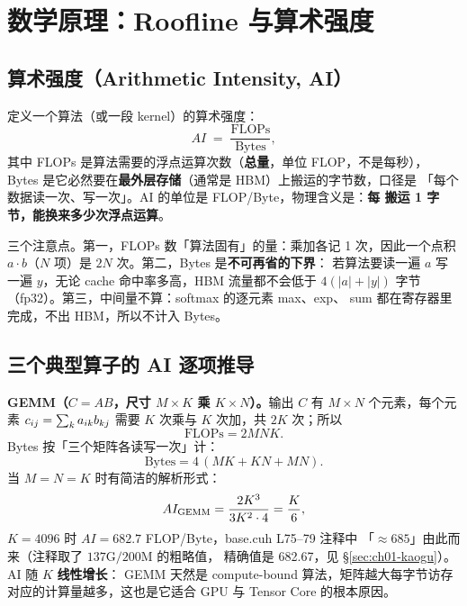 \section{数学原理：Roofline 与算术强度}\label{sec:ch01-math}

\subsection{算术强度（Arithmetic Intensity, AI）}

定义一个算法（或一段 kernel）的算术强度：
\begin{equation}
  AI \;=\; \frac{\mathrm{FLOPs}}{\mathrm{Bytes}},
  \label{eq:ch01-ai}
\end{equation}
其中 FLOPs 是算法需要的浮点运算次数（\textbf{总量}，单位 FLOP，不是每秒），
Bytes 是它必然要在\textbf{最外层存储}（通常是 HBM）上搬运的字节数，口径是
「每个数据读一次、写一次」。AI 的单位是 FLOP/Byte，物理含义是：\textbf{每
搬运 1 字节，能换来多少次浮点运算}。

三个注意点。第一，FLOPs 数「算法固有」的量：乘加各记 1 次，因此一个点积
$a\cdot b$（$N$ 项）是 $2N$ 次。第二，Bytes 是\textbf{不可再省的下界}：
若算法要读一遍 $a$ 写一遍 $y$，无论 cache 命中率多高，HBM 流量都不会低于
$4(|a|+|y|)$ 字节（fp32）。第三，中间量不算：softmax 的逐元素 max、exp、
sum 都在寄存器里完成，不出 HBM，所以不计入 Bytes。

\subsection{三个典型算子的 AI 逐项推导}

\textbf{GEMM（$C = AB$，尺寸 $M{\times}K$ 乘 $K{\times}N$）。}输出 $C$ 有
$M \times N$ 个元素，每个元素 $c\sb{ij} = \sum\sb{k} a\sb{ik} b\sb{kj}$ 需要
$K$ 次乘与 $K$ 次加，共 $2K$ 次；所以
\begin{equation}
  \mathrm{FLOPs} = 2MNK .
\end{equation}
Bytes 按「三个矩阵各读写一次」计：
\begin{equation}
  \mathrm{Bytes} = 4\,(MK + KN + MN).
\end{equation}
当 $M = N = K$ 时有简洁的解析形式：
\begin{equation}
  AI\sb{\mathrm{GEMM}} = \frac{2K^3}{3K^2 \cdot 4} = \frac{K}{6},
  \label{eq:ch01-gemm-ai}
\end{equation}
$K = 4096$ 时 $AI = 682.7$ FLOP/Byte，base.cuh L75--79 注释中
「$\approx 685$」由此而来（注释取了 $137\mathrm{G}/200\mathrm{M}$ 的粗略值，
精确值是 682.67，见 \S\ref{sec:ch01-kaogu}）。AI 随 $K$ \textbf{线性增长}：
GEMM 天然是 compute-bound 算法，矩阵越大每字节访存对应的计算量越多，这也是它适合 GPU 与
Tensor Core 的根本原因。

